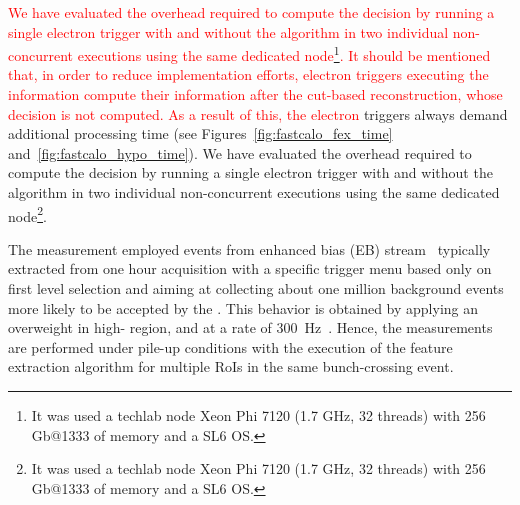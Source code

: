 \textcolor{red}{We have evaluated the overhead required to compute the \rnn{} decision by running a single electron trigger with and without the \rnn algorithm in two individual non-concurrent executions using the same dedicated node\footnote{It was used a techlab node Xeon Phi 7120 (1.7 GHz, 32 threads) with 256 Gb@1333 of memory and a SL6 OS.}. It should be mentioned that, in order to reduce implementation efforts, electron triggers executing the \rnn{} information compute their information after the cut-based reconstruction, whose decision is not computed. As a result of this, the \rnn{} electron }
triggers always demand additional \fastcalo processing time (see Figures~\ref{fig:fastcalo_fex_time}
and~\ref{fig:fastcalo_hypo_time}).  We have evaluated the overhead required to
compute the \rnn{} decision by running a single electron trigger with and without
the \rnn{} algorithm in two individual non-concurrent executions using the same
dedicated node\footnote{It was used a techlab node Xeon Phi 7120 (1.7 GHz, 32 threads) 
	with 256 Gb@1333 of memory and a SL6 OS.}.

The measurement employed events from enhanced bias (EB)
stream~\cite{eb_description} typically extracted from one hour acquisition with
a specific trigger menu based only on first level selection and aiming at
collecting about one million background events more likely to be accepted by the
\hlt{}. This behavior is obtained by applying an overweight in high-\pt{} region,
and at a rate of \SI{300}{\hertz}~\cite{eb_specifications}. Hence, the
measurements are performed under pile-up conditions with the execution of the
feature extraction algorithm for multiple RoIs in the same bunch-crossing event.


